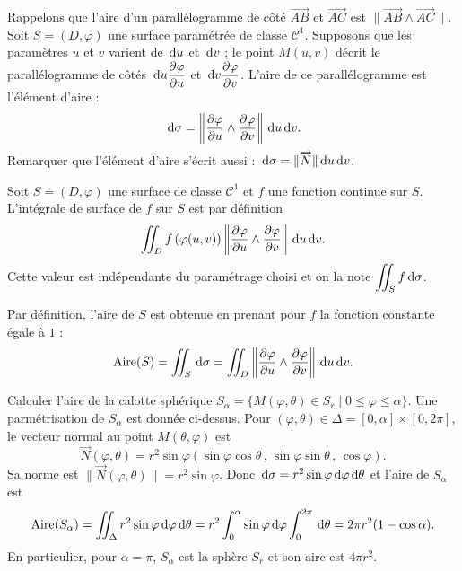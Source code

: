 \documentclass[class=report,crop=false]{standalone}
\begin{document}
\noindent Rappelons que l'aire d'un parallélogramme de c\^oté $\overrightarrow{AB}$ et $\overrightarrow{AC}$ est $\|\overrightarrow{AB}\wedge \overrightarrow{AC}\|$. Soit $S=(D,\varphi)$ une surface paramétrée de classe $\mathscr{C}^1$. Supposons que les paramètres $u$ et $v$ varient de $\,\mathrm{d} u$ et $\,\mathrm{d} v$ ; le point $M(u,v)$ décrit le parallélogramme de c\^otés $\displaystyle \,\mathrm{d} u\frac{\partial \varphi }{\partial u}$ et $\displaystyle \,\mathrm{d} v\frac{\partial \varphi }{\partial v}$. L'aire de ce parallélogramme est l'élément d'aire :
$$\,\mathrm{d} \sigma =\left\|\frac{\partial \varphi }{\partial u}\wedge \frac{\partial \varphi }{\partial v}\right\|\,\mathrm{d} u\,\mathrm{d} v.$$
Remarquer que l'élément d'aire s'écrit aussi : $\,\mathrm{d} \sigma =\|\overrightarrow{N}\|\,\mathrm{d} u\,\mathrm{d} v$.

\vskip6mm

\begin{definition}[\bf Proposition]Soit $S=(D,\varphi)$ une surface de classe $\mathscr{C}^1$ et $f$ une fonction continue sur $S$. L'intégrale de surface de $f$ sur $S$ est par définition 
$$\int \!\!\!\!\int _Df\left(\varphi (u,v)\right)\left\|\frac{\partial \varphi }{\partial u}\wedge \frac{\partial \varphi }{\partial v}\right\|\,\mathrm{d} u\,\mathrm{d} v.$$
Cette valeur est indépendante du paramétrage choisi et on la note $\displaystyle \int \!\!\!\!\int _Sf\,\mathrm{d} \sigma$.
\end{definition}

\vskip4mm

\noindent Par définition, l'aire de $S$ est obtenue en prenant pour $f$ la fonction constante égale à $1$ :
$$\aire (S)=\int \!\!\!\!\int _S\d \sigma=\int \!\!\!\!\int _D\left\|\frac{\partial \varphi }{\partial u}\wedge \frac{\partial \varphi }{\partial v}\right\|\d u\d v.$$

\vskip6mm

Calculer l'aire de la calotte sphérique $S_{\alpha}=\{M(\varphi ,\theta )\in S_r\mid 0\leq \varphi \leq \alpha \}$. Une parmétrisation de $S_{\alpha}$ est donnée ci-dessus. Pour $(\varphi ,\theta )\in \Delta =[0,\alpha]\times [0,2\pi]$, le vecteur normal au point $M(\theta ,\varphi)$ est
$$\overrightarrow{N}(\varphi ,\theta )=r^2\sin \varphi \left(\sin \varphi \cos \theta \, ,\, \sin \varphi \sin \theta \, ,\, \cos \varphi \right).$$
Sa norme est $\|\overrightarrow{N}(\varphi ,\theta )\|=r^2\sin \varphi $. Donc $\,\mathrm{d} \sigma =r^2\sin \varphi \,\mathrm{d} \varphi \,\mathrm{d} \theta$ et l'aire de $S_{\alpha}$ est
$${\rm Aire} (S_{\alpha})=\int \!\!\!\!\int _{\Delta}r^2\sin \varphi \,\mathrm{d} \varphi \,\mathrm{d} \theta=r^2\int _0^{\alpha }\sin \varphi \,\mathrm{d} \varphi \int _0^{2\pi}\,\mathrm{d} \theta =2\pi r^2(1-\cos \alpha ).$$
En particulier, pour $\alpha =\pi$, $S_{\alpha}$ est la sphère $S_r$ et son aire est $4\pi r^2$.
\end{document}

